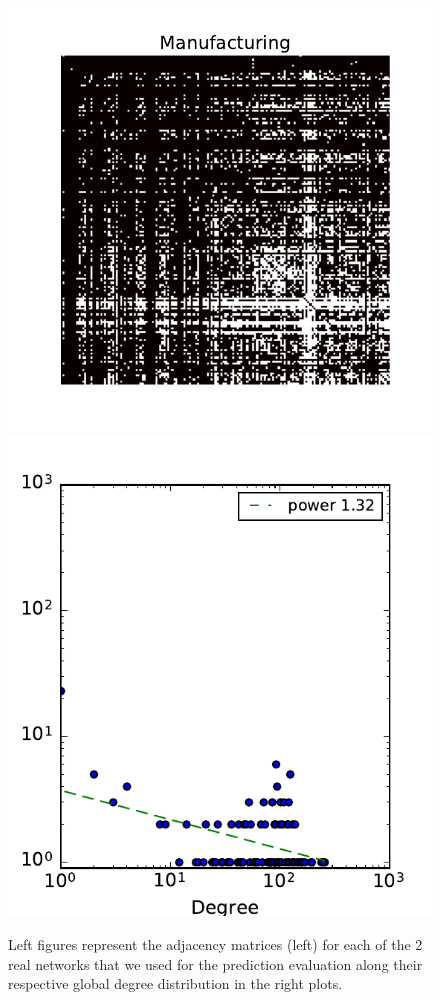 \begin{figure}[h]
	\endminipage
	\vspace{-0.4cm}
	\includegraphics[scale=0.4]{img/manufacturing}
	\endminipage
	\includegraphics[scale=0.4]{img/manufacturing_d}
	\endminipage
	\caption{Left figures represent the adjacency matrices (left) for each of the 2 real networks that we used for the prediction evaluation along their respective global degree distribution in the right plots.}
	\label{fig:real_graph}
\end{figure}



